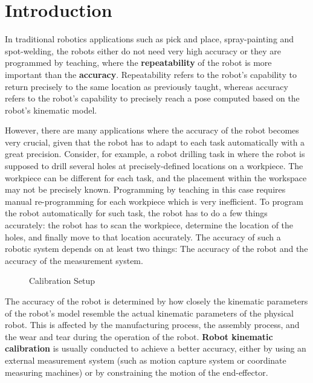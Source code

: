 \section{Introduction}
\label{sec:introduction}

In traditional robotics applications such as pick and place, spray-painting and spot-welding, the robots either do not need very high accuracy or they are programmed by teaching, where the \textbf{repeatability} of the robot is more important than the \textbf{accuracy}. Repeatability refers to the robot's capability to return precisely to the same location as previously taught, whereas accuracy refers to the robot's capability to precisely reach a pose computed based on the robot's kinematic model. 

However, there are many applications where the accuracy of the robot becomes very crucial, given that the robot has to adapt to each task automatically with a great precision. Consider, for example, a robot drilling task in \cite{Suarez-Ruiz2018} where the robot is supposed to drill several holes at precisely-defined locations on a workpiece. The workpiece can be different for each task, and the placement within the workspace may not be precisely known. Programming by teaching in this case requires manual re-programming for each workpiece which is very inefficient. To program the robot automatically for such task, the robot has to do a few things accurately: the robot has to scan the workpiece, determine the location of the holes, and finally move to that location accurately. The accuracy of such a robotic system depends on at least two things: The accuracy of the robot and the accuracy of the measurement system. 
\begin{figure}[t]
  \centering
  \vspace*{2mm}
  \caption{Calibration Setup}
  \label{fig:robot_setup}
\end{figure}

The accuracy of the robot is determined by how closely the kinematic parameters of the robot's model resemble the actual kinematic parameters of the physical robot. This is affected by the manufacturing process, the assembly process, and the wear and tear during the operation of the robot. \textbf{Robot kinematic calibration} is usually conducted to achieve a better accuracy, either by using an external measurement system (such as motion capture system or coordinate measuring machines) or by constraining the motion of the end-effector.

